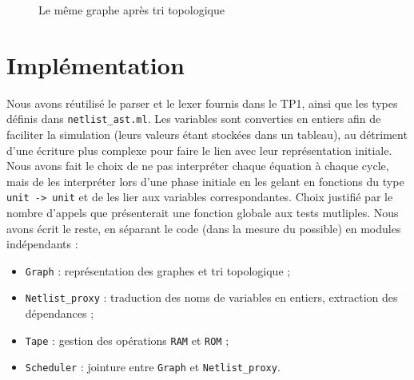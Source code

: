 \documentclass[a4paper]{article}
\begin{document}
\begin{figure}[h]
    \centering
{}
\caption{Le même graphe après tri topologique}
\end{figure}


\section{Implémentation}

Nous avons réutilisé le parser et le lexer fournis dans le TP1, ainsi que les types définis dans \texttt{netlist\_ast.ml}.
Les variables sont converties en entiers afin de faciliter la simulation (leurs valeurs étant stockées dans un tableau), au détriment d'une écriture plus complexe pour faire le lien avec leur représentation initiale.
Nous avons fait le choix de ne pas interpréter chaque équation à chaque cycle, mais de les interpréter lors d'une phase initiale en les gelant en fonctions du type \texttt{unit -> unit} et de les lier aux variables correspondantes. Choix justifié par le nombre d'appels que présenterait une fonction globale aux tests mutliples.
Nous avons écrit le reste, en séparant le code (dans la mesure du possible) en modules indépendants :
\begin{itemize}
    \item \texttt{Graph} : représentation des graphes et tri topologique ;
    \item \texttt{Netlist\_proxy} : traduction des noms de variables en entiers, extraction des dépendances ;
    \item \texttt{Tape} : gestion des opérations \texttt{RAM} et \texttt{ROM} ;
    \item \texttt{Scheduler} : jointure entre \texttt{Graph} et \texttt{Netlist\_proxy}.
\end{itemize}
\end{document}
